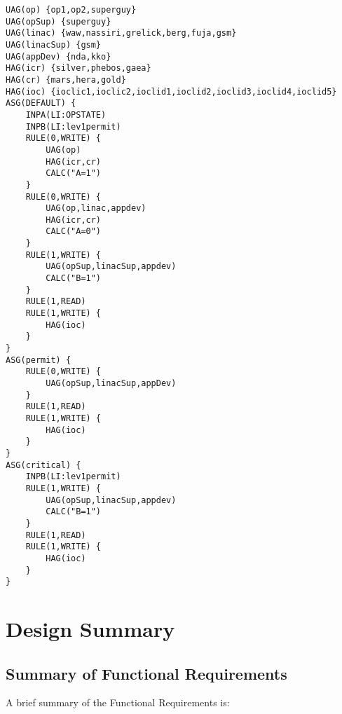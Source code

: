 \begin{verbatim}
UAG(op) {op1,op2,superguy}
UAG(opSup) {superguy}
UAG(linac) {waw,nassiri,grelick,berg,fuja,gsm}
UAG(linacSup) {gsm}
UAG(appDev) {nda,kko}
HAG(icr) {silver,phebos,gaea}
HAG(cr) {mars,hera,gold}
HAG(ioc) {ioclic1,ioclic2,ioclid1,ioclid2,ioclid3,ioclid4,ioclid5}
ASG(DEFAULT) {
    INPA(LI:OPSTATE)
    INPB(LI:lev1permit)
    RULE(0,WRITE) {
        UAG(op)
        HAG(icr,cr)
        CALC("A=1")
    }
    RULE(0,WRITE) {
        UAG(op,linac,appdev)
        HAG(icr,cr)
        CALC("A=0")
    }
    RULE(1,WRITE) {
        UAG(opSup,linacSup,appdev)
        CALC("B=1")
    }
    RULE(1,READ)
    RULE(1,WRITE) {
        HAG(ioc)
    }
}
ASG(permit) {
    RULE(0,WRITE) {
        UAG(opSup,linacSup,appDev)
    }
    RULE(1,READ)
    RULE(1,WRITE) {
        HAG(ioc)
    }
}
ASG(critical) {
    INPB(LI:lev1permit)
    RULE(1,WRITE) {
        UAG(opSup,linacSup,appdev)
        CALC("B=1")
    }
    RULE(1,READ)
    RULE(1,WRITE) {
        HAG(ioc)
    }
}
\end{verbatim}

\section{Design Summary}

\subsection{Summary of Functional Requirements}

A brief summary of the Functional Requirements is:


